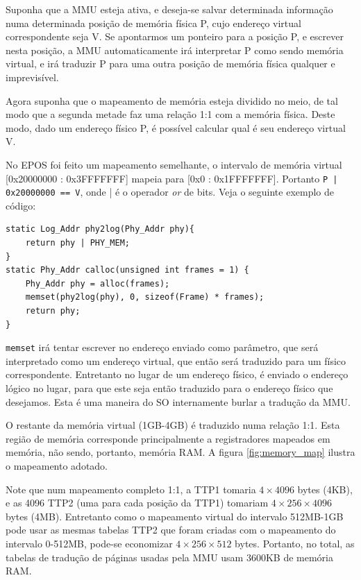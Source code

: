 Suponha que a MMU esteja ativa, e deseja-se salvar determinada informação numa determinada posição de memória física P, cujo endereço virtual correspondente seja V. Se apontarmos um ponteiro para a posição P, e escrever nesta posição, a MMU automaticamente irá interpretar P como sendo memória virtual, e irá traduzir P para uma outra posição de memória física qualquer e imprevisível.

Agora suponha que o mapeamento de memória esteja dividido no meio, de tal modo que a segunda metade faz uma relação 1:1 com a memória física. Deste modo, dado um endereço físico P, é possível calcular qual é seu endereço virtual V. 

No EPOS foi feito um mapeamento semelhante, o intervalo de memória virtual [0x20000000 : 0x3FFFFFFF] mapeia para [0x0 : 0x1FFFFFFF]. Portanto \verb+P | 0x20000000 == V+, onde | é o operador \emph{or} de bits. Veja o seguinte exemplo de código:

\begin{lstlisting}
static Log_Addr phy2log(Phy_Addr phy){
    return phy | PHY_MEM;
}
static Phy_Addr calloc(unsigned int frames = 1) {
    Phy_Addr phy = alloc(frames);
    memset(phy2log(phy), 0, sizeof(Frame) * frames);
    return phy;
}
\end{lstlisting}


\verb+memset+ irá tentar escrever no endereço enviado como parâmetro, que será interpretado como um endereço virtual, que então será traduzido para um físico correspondente. Entretanto no lugar de um endereço físico, é enviado o endereço lógico no lugar, para que este seja então traduzido para o endereço físico que desejamos. Esta é uma maneira do SO internamente burlar a tradução da MMU.

O restante da memória virtual (1GB-4GB) é traduzido numa relação 1:1. Esta região de memória corresponde principalmente a registradores mapeados em memória, não sendo, portanto, memória RAM. A figura \ref{fig:memory_map} ilustra o mapeamento adotado.

Note que num mapeamento completo 1:1, a TTP1 tomaria $4\times4096$ bytes (4KB), e as 4096 TTP2 (uma para cada posição da TTP1) tomariam $4\times256\times4096$ bytes (4MB). Entretanto como o mapeamento virtual do intervalo 512MB-1GB pode usar as mesmas tabelas TTP2 que foram criadas com o mapeamento do intervalo 0-512MB, pode-se economizar $4\times256\times512$ bytes. Portanto, no total, as tabelas de tradução de páginas usadas pela MMU usam 3600KB de memória RAM.

